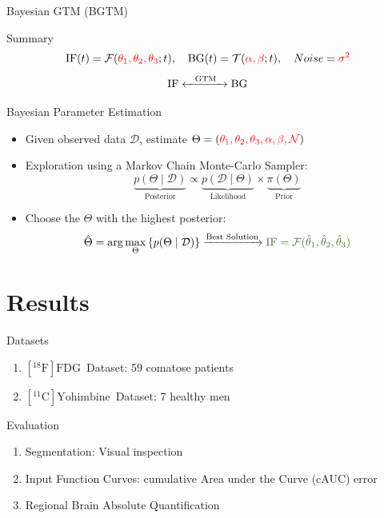 \documentclass[aspectratio=169]{beamer}
\newcommand{\fdg}{$[^{18}\mathrm{F}]\text{FDG}$}
\newcommand{\yohimbine}{$[^{11}\mathrm{C}]\text{Yohimbine}$}
\begin{document}
\begin{frame}[t]{Bayesian GTM (BGTM)}
	\begin{block}{Summary}
		\[
			\text{IF}(t) = \mathcal{F}(\textcolor{red}{\theta_1,\theta_2,\theta_3};t),
			\quad \text{BG}(t)=\mathcal{T}(\textcolor{red}{\alpha,\beta};t),
			\quad Noise=\textcolor{red}{\sigma^2}
		\]
		\[
			\text{IF} \xleftrightarrow{\text{\quad GTM\quad}} \text{BG}
		\]
	\end{block}
	\pause
	\begin{block}{Bayesian Parameter Estimation}
		\small
		\begin{itemize}
			\item<2-> Given observed data $\mathcal{D}$, estimate $\Theta=(\textcolor{red}{\theta_1, \theta_2, \theta_3, \alpha, \beta,\mathcal{N}})$
			\item<3-> Exploration using a Markov Chain Monte-Carlo Sampler:
			      \[
				      \underbrace{p(\Theta \mid \mathcal{D})}_{\text{Posterior}} \propto \underbrace{p(\mathcal{D} \mid \Theta)}_{\text{Likelihood}} \times \underbrace{\pi(\Theta)}_{\text{Prior}}
			      \]
			\item<4-> Choose the $\Theta$ with the highest posterior:
			      \[
				      \hat{\Theta} = \arg\max_{\Theta} \left\{ p(\Theta \mid \mathcal{D}) \right\}
				      \xrightarrow{\text{Best Solution}}
				      \textcolor{OliveGreen}{\text{IF} = \mathcal{F}(\hat{\theta}_1, \hat{\theta}_2, \hat{\theta}_3)}
			      \]
		\end{itemize}
	\end{block}
\end{frame}



\section{Results}
\begin{frame}{Datasets}
	\begin{enumerate}
		\large
		\setlength\itemsep{10em}
		\item \fdg\ Dataset: 59 comatose patients
		\item \yohimbine\ Dataset: 7 healthy men
	\end{enumerate}
\end{frame}
\begin{frame}{Evaluation}
	\begin{enumerate}
		\itemsep 6em
		\large
		\item Segmentation: Visual inspection
		\item Input Function Curves: cumulative Area under the Curve (cAUC) error
		\item Regional Brain Absolute Quantification
	\end{enumerate}

\end{frame}
\end{document}
